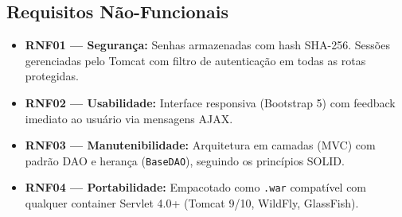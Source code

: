 \subsection{Requisitos Não-Funcionais}

\begin{itemize}
	\item \textbf{RNF01 --- Segurança:} Senhas armazenadas com hash SHA-256. Sessões gerenciadas pelo Tomcat com filtro de autenticação em todas as rotas protegidas.
	\item \textbf{RNF02 --- Usabilidade:} Interface responsiva (Bootstrap 5) com feedback imediato ao usuário via mensagens AJAX.
	\item \textbf{RNF03 --- Manutenibilidade:} Arquitetura em camadas (MVC) com padrão DAO e herança (\texttt{BaseDAO}), seguindo os princípios SOLID.
	\item \textbf{RNF04 --- Portabilidade:} Empacotado como \texttt{.war} compatível com qualquer container Servlet 4.0+ (Tomcat 9/10, WildFly, GlassFish).
\end{itemize}
